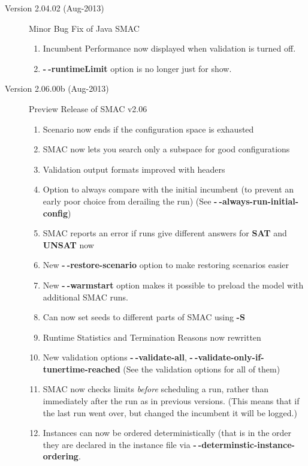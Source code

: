 \documentclass[11pt,letterpaper,oneside]{article}
\begin{document}
\begin{description}
\begin{enumerate}
			\end{enumerate}

			 \item[Version 2.04.02 (Aug-2013)] Minor Bug Fix of Java SMAC
	              \begin{enumerate}
                     \item Incumbent Performance now displayed when validation is turned off.
                     \item \textbf{-$~\!$-runtimeLimit} option is no longer just for show.
                  \end{enumerate}

			 \item[Version 2.06.00b (Aug-2013)] Preview Release of SMAC v2.06
	              \begin{enumerate}
                     \item Scenario now ends if the configuration space is exhausted
					 \item SMAC now lets you search only a subspace for good configurations
					 \item Validation output formats improved with headers
					 \item Option to always compare with the initial incumbent (to prevent an early poor choice from derailing the run) (See \textbf{-$~\!$-always-run-initial-config})
					 \item SMAC reports an error if runs give different answers for \textbf{SAT} and \textbf{UNSAT} now
					 \item New \textbf{-$~\!$-restore-scenario} option to make restoring scenarios easier
					 \item New \textbf{-$~\!$-warmstart} option makes it possible to preload the model with additional SMAC runs.
					 \item Can now set seeds to different parts of SMAC using \textbf{-S}
					 \item Runtime Statistics and Termination Reasons now rewritten
					 \item New validation options \textbf{-$~\!$-validate-all}, \textbf{-$~\!$-validate-only-if-tunertime-reached} (See the validation options for all of them)
					 \item SMAC now checks limits \textit{before} scheduling a run, rather than immediately after the run as in previous versions. (This means that if the last run went over, but changed the incumbent it will be logged.)
					 \item Instances can now be ordered deterministically (that is in the order they are declared in the instance file via \textbf{-$~\!$-determinstic-instance-ordering}.

\end{enumerate}
\end{description}
\end{document}
